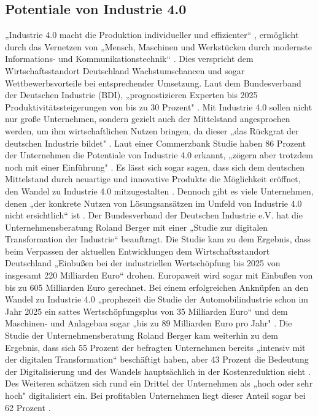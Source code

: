 \subsection{Potentiale von Industrie 4.0}\label{sec:PotentialeIndustrie4.0}
„Industrie 4.0 macht die Produktion individueller und effizienter“ \cite{6}, ermöglicht durch das Vernetzen von „Mensch, Maschinen und Werkstücken durch modernste Informations- und Kommunikationstechnik“ \cite{6}. Dies verspricht dem Wirtschaftsstandort Deutschland Wachstumschancen und sogar Wettbewerbsvorteile bei entsprechender Umsetzung. Laut dem Bundesverband der Deutschen Industrie (BDI), „prognostizieren Experten bis 2025 Produktivitätssteigerungen von bis zu 30 Prozent" \cite{6}.
\newline
Mit Industrie 4.0 sollen nicht nur große Unternehmen, sondern gezielt auch der Mittelstand angesprochen werden, um ihm wirtschaftlichen Nutzen bringen, da dieser „das Rückgrat der deutschen Industrie bildet" \cite[S.4]{2}. Laut einer Commerzbank Studie haben 86 Prozent der Unternehmen die Potentiale von Industrie 4.0 erkannt, „zögern aber trotzdem noch mit einer Einführung" \cite[S.4]{2}. Es lässt sich sogar sagen, dass sich dem deutschen Mittelstand durch neuartige und innovative Produkte die Möglichkeit eröffnet, den Wandel zu Industrie 4.0 mitzugestalten \cite[S.8]{2}. Dennoch gibt es viele Unternehmen, denen „der konkrete Nutzen von Lösungsansätzen im Umfeld von Industrie 4.0 nicht ersichtlich“ ist \cite[S.7]{2}. 
\newline
Der Bundesverband der Deutschen Industrie e.V. hat die Unternehmensberatung Roland Berger mit einer „Studie zur digitalen Transformation der Industrie“ \cite{8} beauftragt. Die Studie kam zu dem Ergebnis, dass beim Verpassen der aktuellen Entwicklungen dem Wirtschaftsstandort Deutschland „Einbußen bei der industriellen Wertschöpfung bis 2025 von insgesamt 220 Milliarden Euro“ \cite{8} drohen. Europaweit wird sogar mit Einbußen von bis zu 605 Milliarden Euro gerechnet. Bei einem erfolgreichen Anknüpfen an den Wandel zu Industrie 4.0 „prophezeit die Studie der Automobilindustrie schon im Jahr 2025 ein sattes Wertschöpfungsplus von 35 Milliarden Euro“ \cite{8} und dem Maschinen- und Anlagebau sogar „bis zu 89 Milliarden Euro pro Jahr" \cite{8}. Die Studie der Unternehmensberatung Roland Berger kam weiterhin zu dem Ergebnis, dass sich 55 Prozent der befragten Unternehmen bereits „intensiv mit der digitalen Transformation“ \cite{8} beschäftigt haben, aber 43 Prozent die Bedeutung der Digitalisierung und des Wandels hauptsächlich in der Kostenreduktion sieht \cite{8}. Des Weiteren schätzen sich rund ein Drittel der Unternehmen als „hoch oder sehr hoch" \cite{8} digitalisiert ein. Bei profitablen Unternehmen liegt dieser Anteil sogar bei 62 Prozent \cite{8}.
